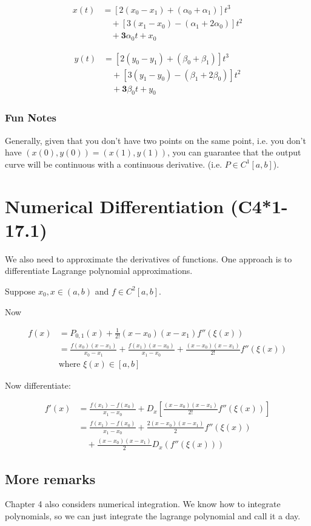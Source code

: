 \documentclass[12pt]{article}
\begin{document}
\begin{align*}
    x(t) &= \left[ 2(x_0 - x_1) + (\alpha_0 + \alpha_1) \right] t^3 \\
         &\quad + \left[ 3(x_1 - x_0) - (\alpha_1 + 2\alpha_0) \right] t^2 \\
         &\quad + \mathbf{3}\alpha_0 t + x_0
\end{align*}

\begin{align*}
    y(t) &= \left[ 2(y_0 - y_1) + (\beta_0 + \beta_1) \right] t^3 \\
         &\quad + \left[ 3(y_1 - y_0) - (\beta_1 + 2\beta_0) \right] t^2 \\
         &\quad + \mathbf{3}\beta_0 t + y_0
\end{align*}

\subsubsection{Fun Notes}

Generally, given that you don't have two points on the same point, i.e. you
don't have
$
  (x(0), y(0)) = (x(1), y(1))
$,
you can guarantee that the output curve will be continuous with a continuous
derivative. (i.e. $P \in C^1[a, b]$).

\section{Numerical Differentiation (C4*1-17.1)}

We also need to approximate the derivatives of functions. One approach is to
differentiate Lagrange polynomial approximations.

Suppose $x_0, x \in (a, b)$ and $f\in C^2[a,b]$.

Now

\begin{align*}
    f(x) &= P_{0,1}(x) + \frac{1}{2!} (x - x_0)(x - x_1) f''(\xi(x)) \\
         &= \frac{f(x_0)(x - x_1)}{x_0 - x_1} + \frac{f(x_1)(x - x_0)}{x_1 - x_0} 
         + \frac{(x - x_0)(x - x_1)}{2!} f''(\xi(x)) \\
         &\text{where } \xi(x) \in [a, b]
\end{align*}

Now differentiate:

\begin{align*}
    f'(x) &= \frac{f(x_1) - f(x_0)}{x_1 - x_0} + D_x \left[ \frac{(x - x_0)(x - x_1)}{2!} f''(\xi(x)) \right] \\
          &= \frac{f(x_1) - f(x_0)}{x_1 - x_0} + \frac{2 (x - x_0)(x - x_1)}{2} f''(\xi(x)) \\
          &\quad + \frac{(x - x_0)(x - x_1)}{2} D_x \left( f''(\xi(x)) \right)
\end{align*}

\subsection{More remarks}
Chapter 4 also considers numerical integration. We know how to integrate
polynomials, so we can just integrate the lagrange polynomial and call it a day.
\end{document}
